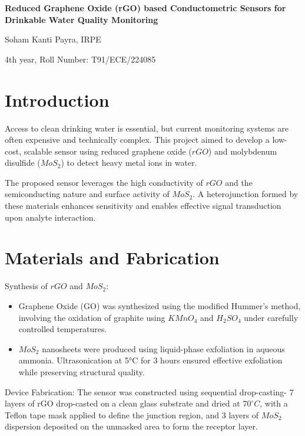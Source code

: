 \documentclass[11pt,a5paper]{article}
\newcommand{\papertitle}[1]{%
    \begin{center}
        {\fontsize{14}{16}\selectfont \textbf{#1}\par}
    \end{center}
}
\newcommand{\paperauthor}[2]{%
    \begin{center}
        {\fontsize{11}{13}\selectfont #1, #2\par}
    \end{center}
}
\newcommand{\paperyearroll}[2]{%
    \begin{center}
        {\fontsize{11}{13}\selectfont #1, #2\par}
    \end{center}
}
\begin{document}
\singlespacing

\papertitle{Reduced Graphene Oxide (rGO) based
Conductometric Sensors for Drinkable Water
Quality Monitoring}

\paperauthor{Soham Kanti Payra}{IRPE}
\vspace{-2em}
\paperyearroll{4th year}{Roll Number: T91/ECE/224085}

\justifying
\vspace{-1.5em}
\section{Introduction}
Access to clean drinking water is essential, but current monitoring systems are often expensive and technically complex. 
This project aimed to develop a low-cost, scalable sensor using reduced graphene oxide ($rGO$) and molybdenum disulfide 
($MoS_{2}$) to detect heavy metal ions in water.

The proposed sensor leverages the high conductivity of $rGO$ and the semiconducting nature and surface activity 
of $MoS_{2}$. 
A heterojunction formed by these materials enhances sensitivity and enables effective signal transduction 
upon analyte interaction.


\vspace{-1.5em}
\section{Materials and Fabrication}
Synthesis of $rGO$ and $MoS_{2}$:
\vspace{-0.5em}
\begin{itemize}[itemsep=0pt]
    \item Graphene Oxide (GO) was synthesized using the modified Hummer’s method,
    involving the oxidation of graphite using $KMnO_{4}$ and $H_{2}SO_{4}$ under carefully controlled temperatures. 
    \item $MoS_{2}$ nanosheets were produced using liquid-phase exfoliation in aqueous ammonia. 
    Ultrasonication at 5°C for 3 hours ensured effective exfoliation while preserving structural quality.
\end{itemize}

Device Fabrication:
The sensor was constructed using sequential drop-casting- 7 layers of rGO drop-casted 
on a clean glass substrate and dried at $70^{\circ}C$, with a Teflon tape mask applied to define the junction region,
and 3 layers of $MoS_{2}$ dispersion deposited on the unmasked area to form the receptor layer.
\end{document}
